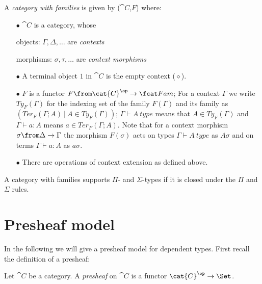 \begin{definition}
A \emph{category with families} is given by ($\cat{C}$,$F$) where:

\begin{itemize}
  \item[$\bullet$] $\cat{C}$ is a category, whose

    objects: $\Gamma, \Delta, \dots$ are \emph{contexts}

    morphisms:  $\sigma, \tau, \dots$ are \emph{context morphisms}

  \item[$\bullet$] A terminal object $1$ in $\cat{C}$ is the empty context ($\diamond$).

  \item[$\bullet$] $F$ is a functor $F\from \cat{C}^\op \to \Fam$; For a
    context $\Gamma$ we write $Ty_F(\Gamma)$ for the indexing set of the family
    $F(\Gamma)$ and its family as $(Ter_F(\Gamma;A)~|~A \in Ty_F(\Gamma))$;
    $\Gamma \vdash A~type$ means that $A \in Ty_F(\Gamma)$ and $\Gamma \vdash a
    : A$ means $a \in Ter_F(\Gamma;A)$. Note that for a context morphism
    $\sigma \from \Delta \to \Gamma$ the morphism $F(\sigma)$ acts on types
    $\Gamma \vdash A~type$ as $A\sigma$ and on terms $\Gamma \vdash a : A$ as
    $a\sigma$.

  \item[$\bullet$] There are operations of context extension as defined above.
\end{itemize}
\end{definition}

A category with families supports $\Pi$- and $\Sigma$-types if it is
closed under the $\Pi$ and $\Sigma$ rules.

\section*{Presheaf model}

In the following we will give a presheaf model for dependent types. First
recall the definition of a presheaf:

\begin{definition}[Presheaf]
  Let $\cat{C}$ be a category. A \emph{presheaf} on $\cat{C}$ is a functor
  $\cat{C}^\op \to \Set$.
\end{definition}

